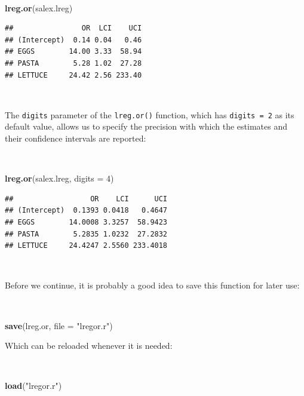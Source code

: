 \documentclass[12pt,a4paper]{book}
\newenvironment{Shaded}{\begin{snugshade}}{\end{snugshade}}
\newcommand{\KeywordTok}[1]{\textcolor[rgb]{0.13,0.29,0.53}{\textbf{#1}}}
\newcommand{\DataTypeTok}[1]{\textcolor[rgb]{0.13,0.29,0.53}{#1}}
\newcommand{\DecValTok}[1]{\textcolor[rgb]{0.00,0.00,0.81}{#1}}
\newcommand{\StringTok}[1]{\textcolor[rgb]{0.31,0.60,0.02}{#1}}
\newcommand{\NormalTok}[1]{#1}
\theoremstyle{definition}
\theoremstyle{definition}
\theoremstyle{definition}
\theoremstyle{remark}
\begin{document}
~

\begin{Shaded}
\begin{Highlighting}[]
\KeywordTok{lreg.or}\NormalTok{(salex.lreg)}
\end{Highlighting}
\end{Shaded}

\begin{verbatim}
##                OR  LCI    UCI
## (Intercept)  0.14 0.04   0.46
## EGGS        14.00 3.33  58.94
## PASTA        5.28 1.02  27.28
## LETTUCE     24.42 2.56 233.40
\end{verbatim}

~

The \texttt{digits} parameter of the \texttt{lreg.or()} function, which
has \texttt{digits\ =\ 2} as its default value, allows us to specify the
precision with which the estimates and their confidence intervals are
reported:

~

\begin{Shaded}
\begin{Highlighting}[]
\KeywordTok{lreg.or}\NormalTok{(salex.lreg, }\DataTypeTok{digits =} \DecValTok{4}\NormalTok{)}
\end{Highlighting}
\end{Shaded}

\begin{verbatim}
##                  OR    LCI      UCI
## (Intercept)  0.1393 0.0418   0.4647
## EGGS        14.0008 3.3257  58.9423
## PASTA        5.2835 1.0232  27.2832
## LETTUCE     24.4247 2.5560 233.4018
\end{verbatim}

~

Before we continue, it is probably a good idea to save this function for
later use:

~

\begin{Shaded}
\begin{Highlighting}[]
\KeywordTok{save}\NormalTok{(lreg.or, }\DataTypeTok{file =} \StringTok{"lregor.r"}\NormalTok{)}
\end{Highlighting}
\end{Shaded}

\newpage

Which can be reloaded whenever it is needed:

~

\begin{Shaded}
\begin{Highlighting}[]
\KeywordTok{load}\NormalTok{(}\StringTok{"lregor.r"}\NormalTok{)}
\end{Highlighting}
\end{Shaded}
\end{document}
